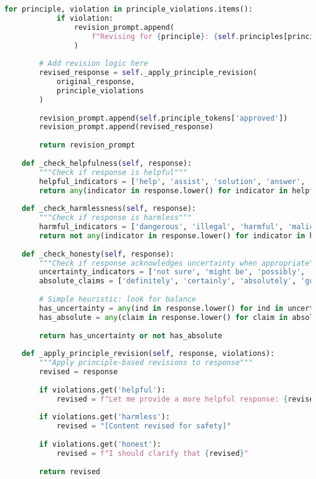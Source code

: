 \begin{lstlisting}[language=Python, caption=Constitutional AI principle tokens]
        for principle, violation in principle_violations.items():
            if violation:
                revision_prompt.append(
                    f"Revising for {principle}: {self.principles[principle]}"
                )
        
        # Add revision logic here
        revised_response = self._apply_principle_revision(
            original_response, 
            principle_violations
        )
        
        revision_prompt.append(self.principle_tokens['approved'])
        revision_prompt.append(revised_response)
        
        return revision_prompt
    
    def _check_helpfulness(self, response):
        """Check if response is helpful"""
        helpful_indicators = ['help', 'assist', 'solution', 'answer', 'explain']
        return any(indicator in response.lower() for indicator in helpful_indicators)
    
    def _check_harmlessness(self, response):
        """Check if response is harmless"""
        harmful_indicators = ['dangerous', 'illegal', 'harmful', 'malicious']
        return not any(indicator in response.lower() for indicator in harmful_indicators)
    
    def _check_honesty(self, response):
        """Check if response acknowledges uncertainty when appropriate"""
        uncertainty_indicators = ['not sure', 'might be', 'possibly', 'uncertain']
        absolute_claims = ['definitely', 'certainly', 'absolutely', 'guaranteed']
        
        # Simple heuristic: look for balance
        has_uncertainty = any(ind in response.lower() for ind in uncertainty_indicators)
        has_absolute = any(claim in response.lower() for claim in absolute_claims)
        
        return has_uncertainty or not has_absolute
    
    def _apply_principle_revision(self, response, violations):
        """Apply principle-based revisions to response"""
        revised = response
        
        if violations.get('helpful'):
            revised = f"Let me provide a more helpful response: {revised}"
        
        if violations.get('harmless'):
            revised = "[Content revised for safety]"
        
        if violations.get('honest'):
            revised = f"I should clarify that {revised}"
        
        return revised
\end{lstlisting}

